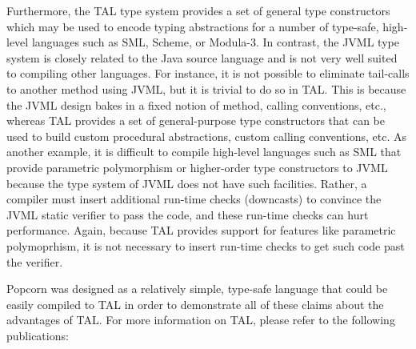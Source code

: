 \documentclass[titlepage,10pt]{article}
\begin{document}
Furthermore, the TAL type system provides a set of general type
constructors which may be used to encode typing abstractions for a
number of type-safe, high-level languages such as SML, Scheme, or
Modula-3.  In contrast, the JVML type system is closely related to the
Java source language and is not very well suited to compiling other
languages.  For instance, it is not possible to eliminate tail-calls to
another method using JVML, but it is trivial to do so in TAL.  This is
because the JVML design bakes in a fixed notion of method, calling
conventions, etc., whereas TAL provides a set of general-purpose type
constructors that can be used to build custom procedural abstractions,
custom calling conventions, etc.  As another example, it is difficult to
compile high-level languages such as SML that provide parametric
polymorphism or higher-order type constructors to JVML because the type
system of JVML does not have such facilities.  Rather, a compiler must
insert additional run-time checks (downcasts) to convince the JVML
static verifier to pass the code, and these run-time checks can hurt
performance.  Again, because TAL provides support for features like
parametric polymoprhism, it is not necessary to insert run-time checks
to get such code past the verifier.

Popcorn was designed as a relatively simple, type-safe language that
could be easily compiled to TAL in order to demonstrate all of these
claims about the advantages of TAL.  For more information on TAL, please
refer to the following publications:
\end{document}
